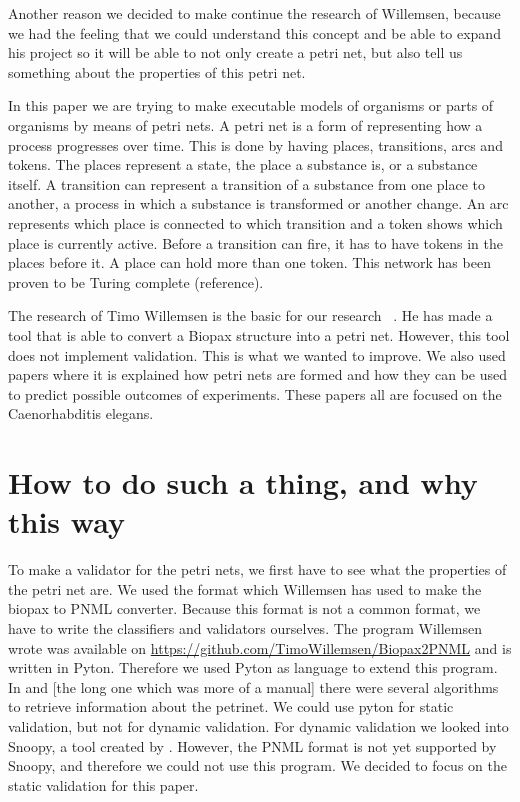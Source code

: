 \documentclass[12pt,a4paper,draft]{article}
\begin{document}
    Another reason we decided to make continue the research of Willemsen, because we had the feeling that we could understand this concept and be able to expand his project so it will be able to not only create a petri net, but also tell us something about the properties of this petri net.
    
    In this paper we are trying to make executable models of organisms or parts of organisms by means of petri nets. A petri net is a form of representing how a process progresses over time. This is done by having places, transitions, arcs and tokens. The places represent a state, the place a substance is, or a substance itself. A transition can represent a transition of a substance from one place to another, a process in which a substance is transformed or another change. An arc represents which place is connected to which transition and a token shows which place is currently active. Before a transition can fire, it has to have tokens in the places before it. A place can hold more than one token. This network has been proven to be Turing complete (reference).
    
    The research of Timo Willemsen is the basic for our research~ \cite{Willemsen2013}. He has made a tool that is able to convert a Biopax structure into a petri net. However, this tool does not implement validation. This is what we wanted to improve. We also used papers
    \cite{Bonzanni2014, Bonzanni2009} where it is explained how petri nets are formed and how they can be used to predict possible outcomes of experiments. These papers all are focused on the Caenorhabditis elegans.
    
\section{How to do such a thing, and why this way}\label{sec:methods}

    To make a validator for the petri nets, we first have to see what the properties of the petri net are. We used the format which Willemsen has used to make the biopax to PNML converter. Because this format is not a common format, we have to write the classifiers and validators ourselves. The program Willemsen wrote was available on \url{https://github.com/TimoWillemsen/Biopax2PNML} and is written in Pyton. Therefore we used Pyton as language to extend this program. In \cite{Heiner2008} and [the long one which was more of a manual] there were several algorithms to retrieve information about the petrinet. We could use pyton for static validation, but not for dynamic validation. For dynamic validation we looked into Snoopy, a tool created by \cite{Heiner2012}. However, the PNML format is not yet supported by Snoopy, and therefore we could not use this program. We decided to focus on the static validation for this paper.
    
\end{document}
